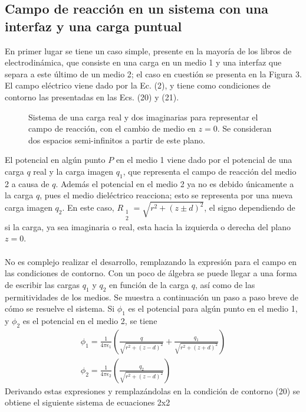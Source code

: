 \documentclass[12pt, notitlepage]{article}
\begin{document}
\subsection{Campo de reacción en un sistema con una interfaz y una carga puntual}
En primer lugar se tiene un caso simple, presente en la mayoría de los libros de electrodinámica, que consiste en una carga en un medio 1 y una interfaz que separa a este último de un medio 2; el caso en cuestión se presenta en la Figura 3. El campo eléctrico viene dado por la Ec. (2), y tiene como condiciones de contorno las presentadas en las Ecs. (20) y (21).
\begin{figure}[H]
\centering

\caption{Sistema de una carga real y dos imaginarias para representar el campo de reacción, con el cambio de medio en $z=0$. Se consideran dos espacios semi-infinitos a partir de este plano.}
\end{figure}
\noindent
El potencial en algún punto $P$ en el medio 1 viene dado por el potencial de una carga $q$ real y la carga imagen $q_1$, que representa el campo de reacción del medio 2 a causa de $q$. Además el potencial en el medio 2 ya no es debido únicamente a la carga $q$, pues el medio dieléctrico reacciona; esto se representa por una nueva carga imagen $q_2$. En este caso, $R_{\substack{1\\2}} = \sqrt{r^2 + (z\pm d)^2}$, el signo dependiendo de si la carga, ya sea imaginaria o real, esta hacia la izquierda o derecha del plano $z=0$.\\\\
No es complejo realizar el desarrollo, remplazando la expresión para el campo en las condiciones de contorno. Con un poco de álgebra se puede llegar a una forma de escribir las cargas $q_1$ y $q_2$ en función de la carga $q$, así como de las permitividades de los medios. Se muestra a continuación un paso a paso breve de cómo se resuelve el sistema. Si $\phi_1$ es el potencial para algún punto en el medio 1, y $\phi_2$ es el potencial en el medio 2, se tiene
\begin{gather}
\phi_1 = \frac{1}{4\pi\epsilon_1}\left(\frac{q}{\sqrt{r^2+(z-d)^2}}+\frac{q_1}{\sqrt{r^2+(z+d)^2}}\right)\\
\phi_2 = \frac{1}{4\pi\epsilon_2}\left(\frac{q_2}{\sqrt{r^2+(z-d)^2}}\right)
\end{gather}
Derivando estas expresiones y remplazándolas en la condición de contorno (20) se obtiene el siguiente sistema de ecuaciones 2x2\\
\end{document}
